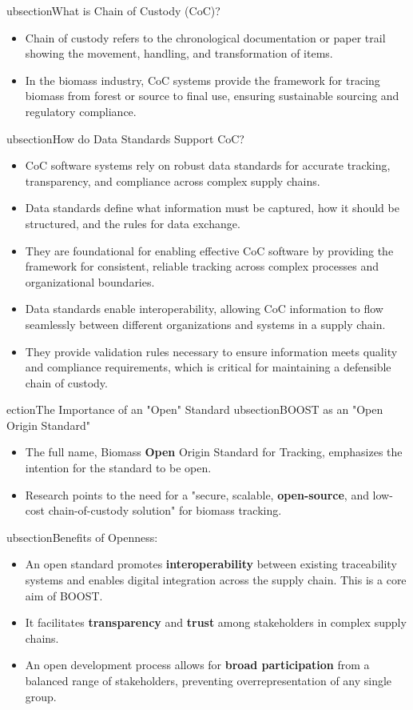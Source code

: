  ubsection{What is Chain of Custody (CoC)?}
\label{sec:org490e68d}
\begin{itemize}
\item Chain of custody refers to the chronological documentation or paper trail showing the movement, handling, and transformation of items.
\item In the biomass industry, CoC systems provide the framework for tracing biomass from forest or source to final use, ensuring sustainable sourcing and regulatory compliance.
\end{itemize}
 ubsection{How do Data Standards Support CoC?}
\label{sec:org2d531b5}
\begin{itemize}
\item CoC software systems rely on robust data standards for accurate tracking, transparency, and compliance across complex supply chains.
\item Data standards define what information must be captured, how it should be structured, and the rules for data exchange.
\item They are foundational for enabling effective CoC software by providing the framework for consistent, reliable tracking across complex processes and organizational boundaries.
\item Data standards enable interoperability, allowing CoC information to flow seamlessly between different organizations and systems in a supply chain.
\item They provide validation rules necessary to ensure information meets quality and compliance requirements, which is critical for maintaining a defensible chain of custody.
\end{itemize}
 ection{The Importance of an "Open" Standard}
\label{sec:orgf91f411}
 ubsection{BOOST as an "Open Origin Standard"}
\label{sec:org8fcfb13}
\begin{itemize}
\item The full name, Biomass \textbf{Open} Origin Standard for Tracking, emphasizes the intention for the standard to be open.
\item Research points to the need for a "secure, scalable, \textbf{open-source}, and low-cost chain-of-custody solution" for biomass tracking.
\end{itemize}
 ubsection{Benefits of Openness:}
\label{sec:org9afe1ab}
\begin{itemize}
\item An open standard promotes \textbf{interoperability} between existing traceability systems and enables digital integration across the supply chain. This is a core aim of BOOST.
\item It facilitates \textbf{transparency} and \textbf{trust} among stakeholders in complex supply chains.
\item An open development process allows for \textbf{broad participation} from a balanced range of stakeholders, preventing overrepresentation of any single group.
\end{itemize}

